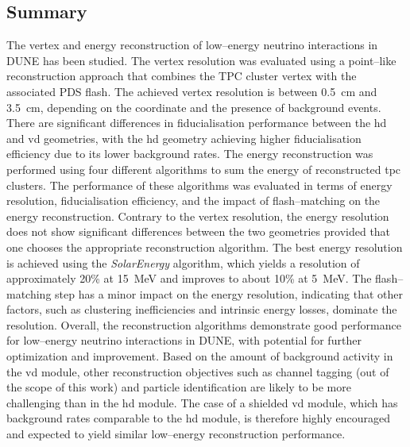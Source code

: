 \subsection{Summary}
The vertex and energy reconstruction of low--energy neutrino interactions in DUNE has been studied. The vertex resolution was evaluated using a point--like reconstruction approach that combines the TPC cluster vertex with the associated PDS flash. The achieved vertex resolution is between \SI{0.5}{\centi\meter} and \SI{3.5}{\centi\meter}, depending on the coordinate and the presence of background events. There are significant differences in fiducialisation performance between the \gls{hd} and \gls{vd} geometries, with the \gls{hd} geometry achieving higher fiducialisation efficiency due to its lower background rates. The energy reconstruction was performed using four different algorithms to sum the energy of reconstructed \gls{tpc} clusters. The performance of these algorithms was evaluated in terms of energy resolution, fiducialisation efficiency, and the impact of flash--matching on the energy reconstruction. Contrary to the vertex resolution, the energy resolution does not show significant differences between the two geometries provided that one chooses the appropriate reconstruction algorithm. The best energy resolution is achieved using the \textit{SolarEnergy} algorithm, which yields a resolution of approximately \num{20}\% at \SI{15}{\mega\electronvolt} and improves to about \num{10}\% at \SI{5}{\mega\electronvolt}. The flash--matching step has a minor impact on the energy resolution, indicating that other factors, such as clustering inefficiencies and intrinsic energy losses, dominate the resolution. Overall, the reconstruction algorithms demonstrate good performance for low--energy neutrino interactions in DUNE, with potential for further optimization and improvement. Based on the amount of background activity in the \gls{vd} module, other reconstruction objectives such as channel tagging (out of the scope of this work) and particle identification are likely to be more challenging than in the \gls{hd} module. The case of a shielded \gls{vd} module, which has background rates comparable to the \gls{hd} module, is therefore highly encouraged and expected to yield similar low--energy reconstruction performance.